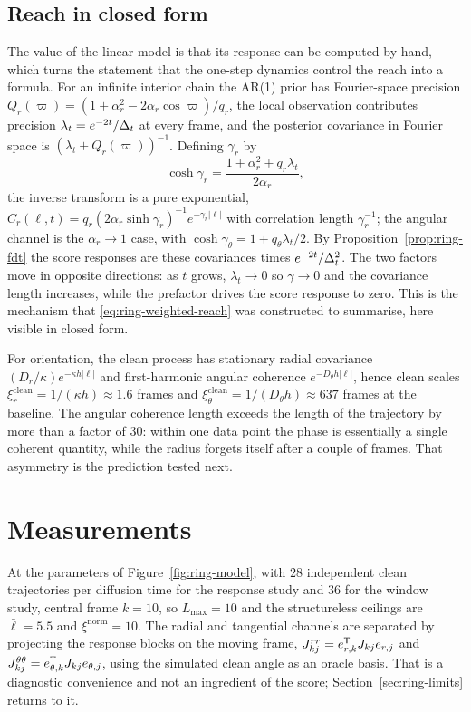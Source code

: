 \subsection{Reach in closed form}\label{sec:ring-analytic-reach}

The value of the linear model is that its response can be computed by hand,
which turns the statement that the one-step dynamics control the reach into a
formula. For an infinite interior chain the AR(1) prior has Fourier-space
precision $Q_r(\varpi) = (1 + \alpha_r^2 - 2\alpha_r\cos\varpi)/q_r$, the local
observation contributes precision $\lambda_t = e^{-2t}/\Delta_t$ at every frame,
and the posterior covariance in Fourier space is
$(\lambda_t + Q_r(\varpi))^{-1}$. Defining $\gamma_r$ by
\begin{equation}
  \cosh\gamma_r = \frac{1 + \alpha_r^2 + q_r \lambda_t}{2\alpha_r} ,
  \label{eq:ring-gamma}
\end{equation}
the inverse transform is a pure exponential,
$C_r(\ell,t) = q_r(2\alpha_r\sinh\gamma_r)^{-1}e^{-\gamma_r|\ell|}$ with
correlation length $\gamma_r^{-1}$; the angular channel is the
$\alpha_r \to 1$ case, with
$\cosh\gamma_\theta = 1 + q_\theta\lambda_t/2$. By
Proposition~\ref{prop:ring-fdt} the score responses are these covariances times
$e^{-2t}/\Delta_t^2$. The two factors move in opposite directions: as $t$ grows,
$\lambda_t \to 0$ so $\gamma \to 0$ and the covariance length increases, while
the prefactor drives the score response to zero. This is the mechanism that
\eqref{eq:ring-weighted-reach} was constructed to summarise, here visible in
closed form.

For orientation, the clean process has stationary radial covariance
$(D_r/\kappa)e^{-\kappa h|\ell|}$ and first-harmonic angular coherence
$e^{-D_\theta h |\ell|}$, hence clean scales
$\xi^{\mathrm{clean}}_r = 1/(\kappa h) \approx 1.6$ frames and
$\xi^{\mathrm{clean}}_\theta = 1/(D_\theta h) \approx 637$ frames at the
baseline. The angular coherence length exceeds the length of the trajectory by
more than a factor of $30$: within one data point the phase is essentially a
single coherent quantity, while the radius forgets itself after a couple of
frames. That asymmetry is the prediction tested next.

\section{Measurements}\label{sec:ring-measurements}

At the parameters of Figure~\ref{fig:ring-model}, with $28$ independent clean
trajectories per diffusion time for the response study and $36$ for the window
study, central frame $k = 10$, so $L_{\max} = 10$ and the structureless
ceilings are $\bar\ell = 5.5$ and $\xi^{\mathrm{norm}} = 10$. The radial and
tangential channels are separated by projecting the response blocks on the
moving frame, $J^{rr}_{kj} = e_{r,k}^{\mathsf{T}}J_{kj}e_{r,j}$ and
$J^{\theta\theta}_{kj} = e_{\theta,k}^{\mathsf{T}}J_{kj}e_{\theta,j}$, using the
simulated clean angle as an oracle basis. That is a diagnostic convenience and
not an ingredient of the score; Section~\ref{sec:ring-limits} returns to it.

